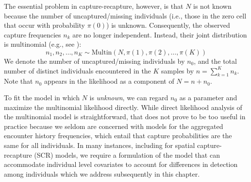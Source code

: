 The essential problem in capture-recapture, however, is that $N$ is
not known because the number of uncaptured/missing individuals (i.e.,
those in the zero cell that occur with probability $\pi(0)$) is
unknown.  Consequently, the observed capture frequencies $n_k$ are no
longer independent. Instead, their joint distribution is multinomial
(e.g., see \citet[][p. xyz]{illian_etal:2008}):
\begin{equation}
    n_1, n_2, \ldots, n_K \sim \mathrm{Multin}(N, \pi(1), \pi(2), \ldots, \pi(K))
\label{closed.eq.multinomial4m0}
\end{equation}
We denote the
number of uncaptured/missing individuals by
$n_0$, and the total number of distinct individuals encountered in the $K$ samples 
by $n = \sum_{k=1}^K n_k$.
Note that $n_{0}$ appears 
in the likelihood as a component of  $N = n + n_{0}$.


To fit the model in which $N$ is {\it unknown}, we can regard $n_{0}$ as a
parameter and maximize the multinomial likelihood directly.  While
direct likelihood analysis of the multinomial model is
straightforward, that does not prove to be too useful in practice
because we seldom are concerned with models for the aggregated
encounter history frequencies, which entail that capture probabilities are the 
same for all individuals. In many instances, including for
spatial capture-recapture (SCR) models, we require a formulation of
the model that can accommodate individual level covariates to account for 
differences in detection among individuals which we
address subsequently in this chapter.


